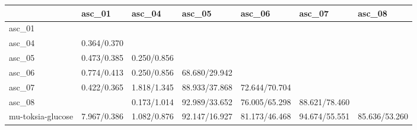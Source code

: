 \begin{tabular}{lllllll}
\toprule
{} &       asc\_01 &       asc\_04 &         asc\_05 &         asc\_06 &         asc\_07 &         asc\_08 \\
\midrule
asc\_01            &              &              &                &                &                &                \\
asc\_04            &  0.364/0.370 &              &                &                &                &                \\
asc\_05            &  0.473/0.385 &  0.250/0.856 &                &                &                &                \\
asc\_06            &  0.774/0.413 &  0.250/0.856 &  68.680/29.942 &                &                &                \\
asc\_07            &  0.422/0.365 &  1.818/1.345 &  88.933/37.868 &  72.644/70.704 &                &                \\
asc\_08            &              &  0.173/1.014 &  92.989/33.652 &  76.005/65.298 &  88.621/78.460 &                \\
mu-toksia-glucose &  7.967/0.386 &  1.082/0.876 &  92.147/16.927 &  81.173/46.468 &  94.674/55.551 &  85.636/53.260 \\
\bottomrule
\end{tabular}
